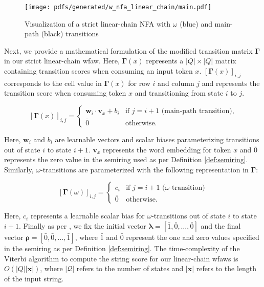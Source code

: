 \begin{figure}[t!]
  \centering
  \texttt{[image: pdfs/generated/w\_nfa\_linear\_chain/main.pdf]}
  \caption{Visualization of a strict linear-chain NFA with
    $\omega$ (blue) and main-path (black) transitions}
  \label{fig:omega_fa}
\end{figure}

Next, we provide a mathematical formulation of the modified transition matrix
$\bm{\Gamma}$ in our strict linear-chain \ac{wfaw}. Here, $\bm{\Gamma}(x)$ represents a
$|Q|\times|Q|$ matrix containing transition scores when consuming an input token
$x$. $[\bm{\Gamma}(x)]_{i,j}$ corresponds to the cell value in $\bm{\Gamma}(x)$ for row
$i$ and column $j$ and represents the transition score when consuming token $x$
and transitioning from state $i$ to $j$.

\begin{equation}
  \label{eq:spp_transition_matrix_main}
  [\bm{\Gamma}(x)]_{i,j} =
  \begin{cases}
    \bm{w}_i \cdot \bm{v}_x + b_i  & \text{if } j = i + 1 \text{ (main-path transition),} \\
    \bar{0} & \text{otherwise.}
  \end{cases}
\end{equation}

Here, $\bm{w}_i$ and $b_i$ are learnable vectors and scalar biases
parameterizing transitions out of state $i$ to state $i+1$. $\bm{v}_x$
represents the word embedding for token $x$ and $\bar{0}$ represents the zero
value in the semiring used as per Definition \ref{def:semiring}. Similarly,
$\omega$-transitions are parameterized with the following representation in
$\bm{\Gamma}$:

\begin{equation}
  \label{eq:spp_transition_matrix_omega}
  [\bm{\Gamma}(\omega)]_{i,j} =
  \begin{cases}
    c_i  & \text{if } j = i + 1 \text{ ($\omega$-transition)} \\
    \bar{0} & \text{otherwise.}
  \end{cases}
\end{equation}

Here, $c_i$ represents a learnable scalar bias for $\omega$-transitions out of
state $i$ to state $i+1$. Finally as per \citet{schwartz2018sopa}, we fix the
initial vector $\bm{\lambda} = [\bar{1}, \bar{0}, \ldots, \bar{0}]$ and the final
vector $\bm{\rho} = [\bar{0}, \bar{0}, \ldots, \bar{1}]$, where $\bar{1}$ and
$\bar{0}$ represent the one and zero values specified in the semiring as per
Definition \ref{def:semiring}. The time-complexity of the Viterbi algorithm to
compute the string score for our linear-chain \ac{wfaws} is
$O(|Q||\bm{x}|)$, where $|\mathcal{Q}|$ refers to the number of states and
$|\bm{x}|$ refers to the length of the input string.

